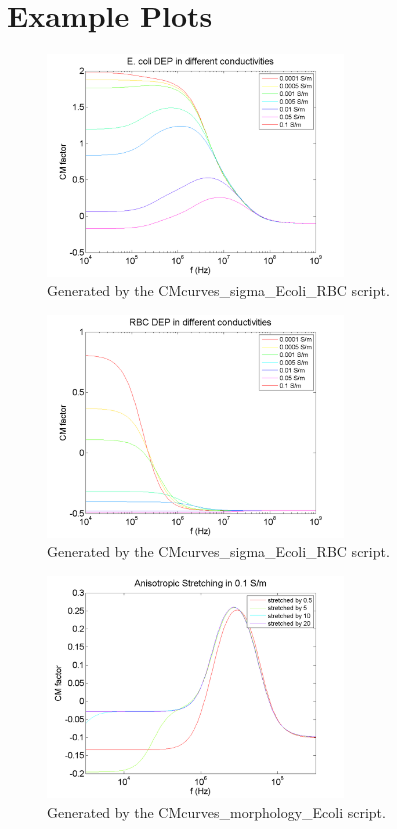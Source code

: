 \documentclass[12pt]{article}
\begin{document}
\newpage

\section{Example Plots}

\begin{figure}[here]
\centering
\includegraphics[width=0.7\textwidth]{Figures/CMcurves_Ecoli.png}
\caption{Generated by the CMcurves\_sigma\_Ecoli\_RBC script.}
\end{figure}

\begin{figure}[here]
\centering
\includegraphics[width=0.7\textwidth]{Figures/CMcurves_RBC.png}
\caption{Generated by the CMcurves\_sigma\_Ecoli\_RBC script.}
\end{figure}

\begin{figure}[here]
\centering
\includegraphics[width=0.7\textwidth]{Figures/CM_AnistropicStretch.png}
\caption{Generated by the CMcurves\_morphology\_Ecoli script.}
\end{figure}
\end{document}
